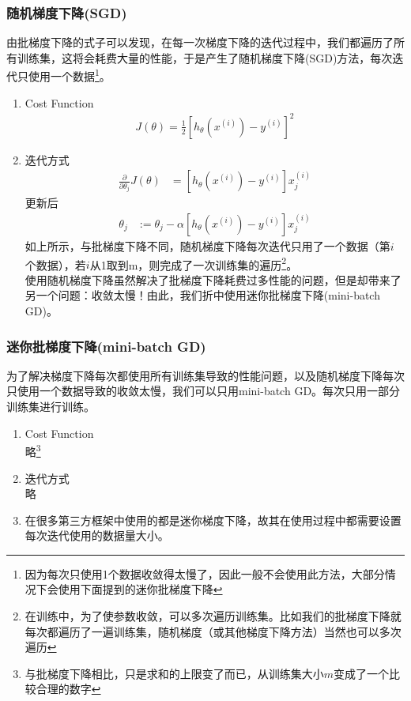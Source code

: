 \subsubsection{随机梯度下降(SGD)}
由批梯度下降的式子可以发现，在每一次梯度下降的迭代过程中，我们都遍历了所有训练集，这将会耗费大量的性能，于是产生了随机梯度下降(SGD)方法，每次迭代只使用一个数据\footnote{因为每次只使用1个数据收敛得太慢了，因此一般不会使用此方法，大部分情况下会使用下面提到的迷你批梯度下降}。 \\
\begin{enumerate}
	\item Cost Function
	\begin{equation}\begin{aligned}
		J(\theta) = \frac{1}{2} \left[h_{\theta} {(x^{(i)})} - y^{(i)}\right]^2
	\end{aligned}\end{equation}

	\item 迭代方式
	\begin{equation}\begin{aligned}
	      \frac{\partial} {\partial \theta_j} J(\theta) &= \left[ h_\theta(x^{(i)}) - y^{(i)} \right]x_j^{(i)}
	\end{aligned}\end{equation}
	更新后
	\begin{equation}\begin{aligned}
		\theta_j &:= \theta_j - \alpha\left[ h_\theta(x^{(i)}) - y^{(i)} \right]x_j^{(i)}
	\end{aligned}\end{equation}
	如上所示，与批梯度下降不同，随机梯度下降每次迭代只用了一个数据（第$i$个数据），若$i$从1取到m，则完成了一次训练集的遍历\footnote{在训练中，为了使参数收敛，可以多次遍历训练集。比如我们的批梯度下降就每次都遍历了一遍训练集，随机梯度（或其他梯度下降方法）当然也可以多次遍历}。\\
	使用随机梯度下降虽然解决了批梯度下降耗费过多性能的问题，但是却带来了另一个问题：收敛太慢！由此，我们折中使用迷你批梯度下降(mini-batch GD)。\\
\end{enumerate}

\subsubsection{迷你批梯度下降(mini-batch GD)}
为了解决梯度下降每次都使用所有训练集导致的性能问题，以及随机梯度下降每次只使用一个数据导致的收敛太慢，我们可以只用mini-batch GD。每次只用一部分训练集进行训练。
\begin{enumerate}
	\item Cost Function \\
	略\footnote{与批梯度下降相比，只是求和的上限变了而已，从训练集大小$m$变成了一个比较合理的数字}

	\item 迭代方式 \\
	略
	\item 在很多第三方框架中使用的都是迷你梯度下降，故其在使用过程中都需要设置每次迭代使用的数据量大小。
\end{enumerate}






